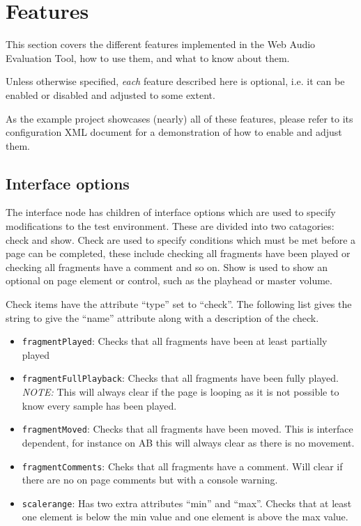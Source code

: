 \documentclass[11pt, oneside]{article}   	%
\begin{document}
\clearpage

\section{Features}

	This section covers the different features implemented in the Web Audio Evaluation Tool, how to use them, and what to know about them. 

	Unless otherwise specified, \emph{each} feature described here is optional, i.e. it can be enabled or disabled and adjusted to some extent. 

	As the example project showcases (nearly) all of these features, please refer to its configuration XML document for a demonstration of how to enable and adjust them.

	\subsection{Interface options}
		\label{sec:interfaceoption}
	    The interface node has children of interface options which are used to specify modifications to the test environment. These are divided into two catagories: check and show. Check are used to specify conditions which must be met before a page can be completed, these include checking all fragments have been played or checking all fragments have a comment and so on. Show is used to show an optional on page element or control, such as the playhead or master volume.
	    
	    Check items have the attribute ``type'' set to ``check''. The following list gives the string to give the ``name'' attribute along with a description of the check.
	    \begin{itemize}
		    \item \texttt{fragmentPlayed}: Checks that all fragments have been at least partially played
		    \item \texttt{fragmentFullPlayback}: Checks that all fragments have been fully played. \emph{NOTE:} This will always clear if the page is looping as it is not possible to know every sample has been played.
		    \item \texttt{fragmentMoved}: Checks that all fragments have been moved. This is interface dependent, for instance on AB this will always clear as there is no movement.
		    \item \texttt{fragmentComments}: Cheks that all fragments have a comment. Will clear if there are no on page comments but with a console warning.
		    \item \texttt{scalerange}: Has two extra attributes ``min'' and ``max''. Checks that at least one element is below the min value and one element is above the max value.
	    \end{itemize}
\end{document}
